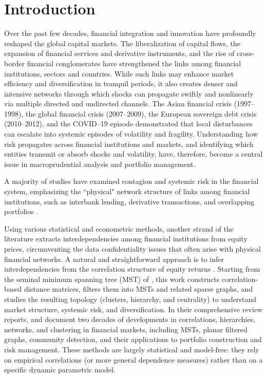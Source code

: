 \section{Introduction}\label{sec:intro}

Over the past few decades, financial integration and innovation have
profoundly reshaped the global capital markets. The liberalization of capital flows, the
expansion of financial services and derivative instruments, and the rise of cross-border financial conglomerates
have strengthened the links among financial institutions, sectors and countries. While such links may enhance
market efficiency and diversification in tranquil periods, it also creates denser and intensive networks
through which shocks can propagate swiftly and nonlinearly via multiple directed and undirected channels. The Asian financial crisis (1997--1998), the global financial crisis
(2007--2009), the European sovereign debt crisis (2010--2012), and the COVID--19 episode
demonstrated that local disturbances can escalate into systemic episodes of volatility and
 fragility. Understanding how risk propagates across financial institutions and markets, and identifying
which entities transmit or absorb shocks and volatility, have, therefore, become a central issue in macroprudential analysis and portfolio management.

A majority of studies have examined contagion and systemic risk in the financial system, emphasizing the ``physical" network structure of links among financial institutions, such as interbank lending, derivative transactions, and overlapping portfolios \citep[see, for example][among others]{Allen_Gale_2000, NIER2007, Haldane_May_2011, GORTON2012, Acemoglu_et_al_2015, Glasserman_Young_2015, POLEDNA2015, GREENWOOD2015}.

Using various statistical and econometric methods, another strand of the literature extracts interdependencies among financial institutions from equity prices, circumventing the data confidentiality issues that often arise with physical financial networks. A natural and straightforward approach is to infer interdependencies from the correlation structure of equity returns \citep[e.g., see][]{Mantegna1999, Tumminello_2005,  TUMMINELLO2010, Massara_et_al_2017, Luu2025}.
Starting from the seminal minimum spanning tree (MST) of \citet{Mantegna1999}, this work constructs correlation-based distance matrices, filters them into MSTs and related sparse graphs, and studies the resulting topology (clusters, hierarchy, and centrality) to understand market structure, systemic risk, and diversification. In their comprehensive review reports, \citet{MartiEtAl2020} and \cite{MASUDA2025} document two decades of developments in correlations, hierarchies, networks, and clustering in financial markets, including MSTs, planar filtered graphs, community detection, and their applications to portfolio construction and risk management. These methods are largely statistical and model-free: they rely on empirical correlations (or more general dependence measures) rather than on a specific dynamic parametric model.

